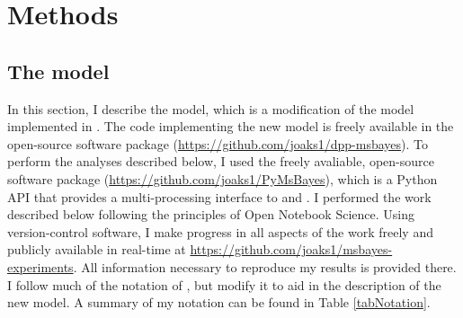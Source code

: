 \section{Methods}

\subsection{The model}
In this section, I describe the model, which is a modification of the model
implemented in \msb \citep{Huang2011,Oaks2012}.
The code implementing the new model is freely available in the open-source
software package \dppmsbayes
(\href{https://github.com/joaks1/dpp-msbayes}{\url{https://github.com/joaks1/dpp-msbayes}}).
To perform the analyses described below, I used the freely avaliable,
open-source software package \pymsbayes
(\href{https://github.com/joaks1/PyMsBayes}{\url{https://github.com/joaks1/PyMsBayes}}),
which is a Python API that provides a multi-processing interface to \msb and
\dppmsbayes.
I performed the work described below following the principles of
Open Notebook Science.
Using version-control software, I make progress in all aspects of the work
freely and publicly available in real-time at
\href{https://github.com/joaks1/msbayes-experiments}{\url{https://github.com/joaks1/msbayes-experiments}}.
All information necessary to reproduce my results is provided there.
I follow much of the notation of \citet{Oaks2012}, but modify it to
aid in the description of the new model.
A summary of my notation can be found in Table \ref{tabNotation}.

